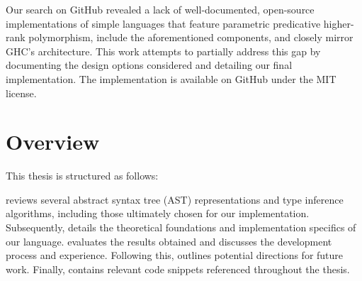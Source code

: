Our search on GitHub revealed a lack of well-documented, open-source implementations of simple languages that feature parametric predicative higher-rank polymorphism, include the aforementioned components, and closely mirror GHC's architecture. This work attempts to partially address this gap by documenting the design options considered and detailing our final implementation. The implementation \cite{deemp-higher-rank-free-foil} is available on GitHub under the MIT license.

\newpage

\section{Overview}

This thesis is structured as follows:

 reviews several abstract syntax tree (AST) representations and type inference algorithms, including those ultimately chosen for our implementation.
Subsequently,  details the theoretical foundations and implementation specifics of our language.
 evaluates the results obtained and discusses the development process and experience.
Following this,  outlines potential directions for future work.
Finally,  contains relevant code snippets referenced throughout the thesis.
